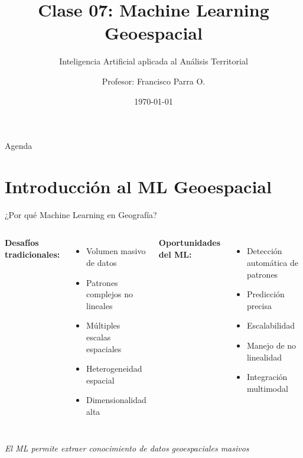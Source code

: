 \documentclass[10pt,aspectratio=169]{beamer}
\title{Clase 07: Machine Learning Geoespacial}
\subtitle{Inteligencia Artificial aplicada al Análisis Territorial}
\author{Profesor: Francisco Parra O.}
\institute{USACH - Ingeniería Civil en Informática}
\date{\today}
\begin{document}
\maketitle

\begin{frame}{Agenda}
    \tableofcontents[hideallsubsections]
\end{frame}

\section{Introducción al ML Geoespacial}

\begin{frame}{¿Por qué Machine Learning en Geografía?}
    \begin{columns}
        \textbf{Desafíos tradicionales:}
        \begin{itemize}
            \item Volumen masivo de datos
            \item Patrones complejos no lineales
            \item Múltiples escalas espaciales
            \item Heterogeneidad espacial
            \item Dimensionalidad alta
        \end{itemize}

        \textbf{Oportunidades del ML:}
        \begin{itemize}
            \item Detección automática de patrones
            \item Predicción precisa
            \item Escalabilidad
            \item Manejo de no linealidad
            \item Integración multimodal
        \end{itemize}
    \end{columns}

    \vspace{5mm}
    \begin{center}
        \colorbox{green!20}{
            \parbox{0.9\textwidth}{
                \centering
                \textit{El ML permite extraer conocimiento de datos geoespaciales masivos}
            }
        }
    \end{center}
\end{frame}
\end{document}
